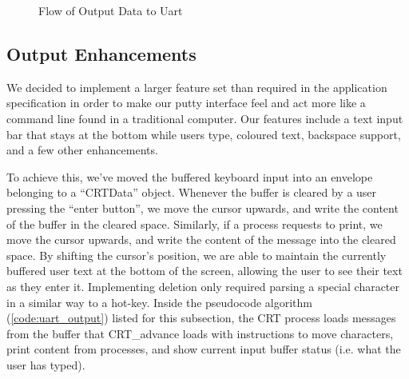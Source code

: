 \documentclass[12pt]{report}
\begin{document}
    \begin{figure}
        \centering
        \caption{Flow of Output Data to Uart}
    \end{figure}

\subsection{Output Enhancements}
\label{sec:outputEnhancements}
    We decided to implement a larger feature set than required in the
    application specification in order to make our putty interface feel and act
    more like a command line found in a traditional computer. Our features
    include a text input bar that stays at the bottom while users type, coloured
    text, backspace support, and a few other enhancements.

    To achieve this, we've moved the buffered keyboard input into an envelope
    belonging to a ``CRTData'' object. Whenever the buffer is cleared by a
    user pressing the ``enter button'', we move the cursor upwards, and write
    the content of the buffer in the cleared space. Similarly, if a process
    requests to print, we move the cursor upwards, and write the content of the
    message into the cleared space. By shifting the cursor's position, we are
    able to maintain the currently buffered user text at the bottom of the
    screen, allowing the user to see their text as they enter it. Implementing
    deletion only required parsing a special character in a similar way to a
    hot-key. Inside the pseudocode algorithm (\ref{code:uart_output}) listed for
    this subsection, the CRT process loads messages from the buffer that
    CRT\_advance loads with instructions to move characters, print content from
    processes, and show current input buffer status (i.e. what the user has
    typed).
\end{document}
